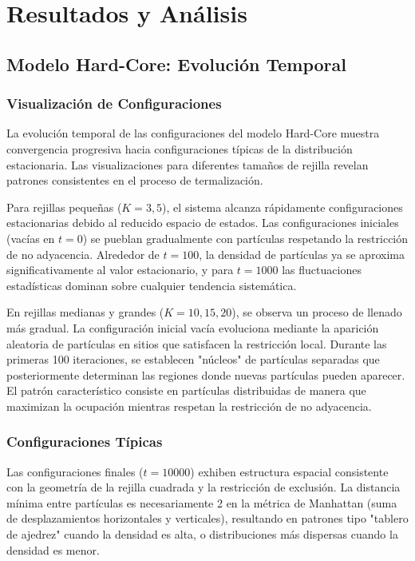 \section{Resultados y Análisis}

\subsection{Modelo Hard-Core: Evolución Temporal}

\subsubsection{Visualización de Configuraciones}

La evolución temporal de las configuraciones del modelo Hard-Core muestra convergencia progresiva hacia configuraciones típicas de la distribución estacionaria. Las visualizaciones para diferentes tamaños de rejilla revelan patrones consistentes en el proceso de termalización.

Para rejillas pequeñas ($K = 3, 5$), el sistema alcanza rápidamente configuraciones estacionarias debido al reducido espacio de estados. Las configuraciones iniciales (vacías en $t=0$) se pueblan gradualmente con partículas respetando la restricción de no adyacencia. Alrededor de $t=100$, la densidad de partículas ya se aproxima significativamente al valor estacionario, y para $t=1000$ las fluctuaciones estadísticas dominan sobre cualquier tendencia sistemática.

En rejillas medianas y grandes ($K = 10, 15, 20$), se observa un proceso de llenado más gradual. La configuración inicial vacía evoluciona mediante la aparición aleatoria de partículas en sitios que satisfacen la restricción local. Durante las primeras 100 iteraciones, se establecen "núcleos" de partículas separadas que posteriormente determinan las regiones donde nuevas partículas pueden aparecer. El patrón característico consiste en partículas distribuidas de manera que maximizan la ocupación mientras respetan la restricción de no adyacencia.

\subsubsection{Configuraciones Típicas}

Las configuraciones finales ($t=10000$) exhiben estructura espacial consistente con la geometría de la rejilla cuadrada y la restricción de exclusión. La distancia mínima entre partículas es necesariamente 2 en la métrica de Manhattan (suma de desplazamientos horizontales y verticales), resultando en patrones tipo "tablero de ajedrez" cuando la densidad es alta, o distribuciones más dispersas cuando la densidad es menor.

